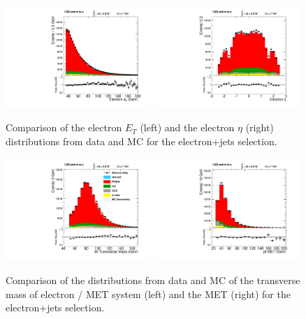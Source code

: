 \begin{figure}[h!t]
  {\centering
    \includegraphics[width=0.49\textwidth]{plots/2012_DataMC/el_W_electron_et.pdf}
    \includegraphics[width=0.49\textwidth]{plots/2012_DataMC/el_W_electron_eta.pdf}
    \caption{Comparison of the electron $E_{T} $ (left) and the
    electron $\eta $ (right) distributions from data and MC for the
    electron+jets selection. 
    }
   \label{fig:elec_electron}}
\end{figure}
\begin{figure}[h!t]
  {\centering
    \includegraphics[width=0.49\textwidth]{plots/2012_DataMC/el_W_mt.pdf}
    \includegraphics[width=0.49\textwidth]{plots/2012_DataMC/el_event_met_pfmet.pdf}
    \caption{Comparison of the distributions from data and MC of the transverse mass
     of electron / MET system (left) and the MET (right) for the
      electron+jets selection. 
      }
    \label{fig:elec_W_Mt}}
\end{figure}
